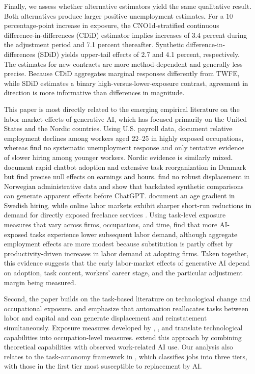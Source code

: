 Finally, we assess whether alternative estimators yield the same qualitative result. Both alternatives produce larger positive unemployment estimates. For a 10 percentage-point increase in exposure, the CNO1d-stratified continuous difference-in-differences (CDiD) estimator implies increases of 3.4 percent during the adjustment period and 7.1 percent thereafter. Synthetic difference-in-differences (SDiD) yields upper-tail effects of 2.7 and 4.1 percent, respectively. The estimates for new contracts are more method-dependent and generally less precise. Because CDiD aggregates marginal responses differently from TWFE, while SDiD estimates a binary high-versus-lower-exposure contrast, agreement in direction is more informative than differences in magnitude.

This paper is most directly related to the emerging empirical literature on the labor-market effects of generative AI, which has focused primarily on the United States and the Nordic countries. Using U.S. payroll data, \citet{brynjolfsson_chandar_chen_2025} document relative employment declines among workers aged 22--25 in highly exposed occupations, whereas \citet{massenkoff_mccrory_2026} find no systematic unemployment response and only tentative evidence of slower hiring among younger workers. Nordic evidence is similarly mixed. \citet{humlum_vestergaard_2025} document rapid chatbot adoption and extensive task reorganization in Denmark but find precise null effects on earnings and hours. \citet{facius_iacono_2026} find no robust displacement in Norwegian administrative data and show that backdated synthetic comparisons can generate apparent effects before ChatGPT. \citet{lodefalk_et_al_2026} document an age gradient in Swedish hiring, while online labor markets exhibit sharper short-run reductions in demand for directly exposed freelance services \citep{hui_reshef_zhou_2024}. Using task-level exposure measures that vary across firms, occupations, and time, \citet{hampole_et_al_2025} find that more AI-exposed tasks experience lower subsequent labor demand, although aggregate employment effects are more modest because substitution is partly offset by productivity-driven increases in labor demand at adopting firms. Taken together, this evidence suggests that the early labor-market effects of generative AI depend on adoption, task content, workers' career stage, and the particular adjustment margin being measured.


Second, the paper builds on the task-based literature on technological change and occupational exposure. \citet{autor_levy_murnane_2003} and \citet{acemoglu_restrepo_2019} emphasize that automation reallocates tasks between labor and capital and can generate displacement and reinstatement simultaneously. Exposure measures developed by \citet{felten_raj_seamans_2021}, \citet{felten_raj_seamans_2023}, and \citet{eloundou_manning_mishkin_rock_2024} translate technological capabilities into occupation-level measures. \citet{massenkoff_mccrory_2026} extend this approach by combining theoretical capabilities with observed work-related AI use. Our analysis also relates to the task-autonomy framework in \citet{garicano2026messy}, which classifies jobs into three tiers, with those in the first tier most susceptible to replacement by AI.

